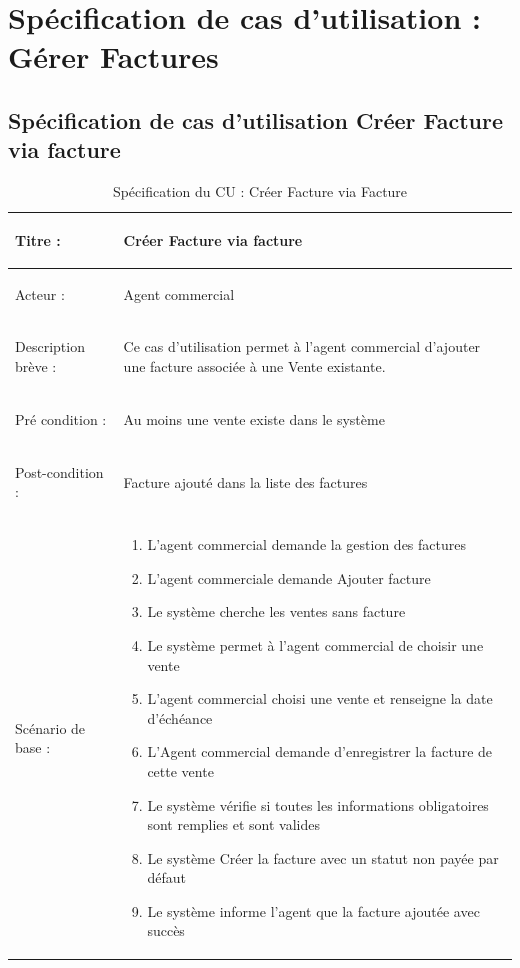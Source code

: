 \newpage
\section{Spécification de cas d'utilisation : Gérer Factures}

\subsection{Spécification de cas d'utilisation Créer Facture via facture}

\begin{longtable}{|>{\bfseries\raggedright\arraybackslash}p{3.5cm}|p{\dimexpr\textwidth-3.5cm-4\tabcolsep-2\arrayrulewidth}|}
\caption{Spécification du CU : Créer Facture via Facture}
\label{tab:cu-creer-facture-facture}\\
\hline
Titre : & Créer Facture via facture \\
\hline
Acteur : & Agent commercial \\
\hline
Description brève : & Ce cas d'utilisation permet à l'agent commercial d'ajouter une facture associée à une Vente existante. \\
\hline
Pré condition : & Au moins une vente existe dans le système \\
\hline
Post-condition : & Facture ajouté dans la liste des factures \\
\hline
Scénario de base : &
\begin{enumerate}[leftmargin=1.5em, topsep=2pt, itemsep=1pt]
  \item L'agent commercial demande la gestion des factures
  \item L'agent commerciale demande Ajouter facture
  \item Le système cherche les ventes sans facture
  \item Le système permet à l'agent commercial de choisir une vente
  \item L'agent commercial choisi une vente et renseigne la date d'échéance
  \item L'Agent commercial demande d'enregistrer la facture de cette vente
  \item Le système vérifie si toutes les informations obligatoires sont remplies et sont valides
  \item Le système Créer la facture avec un statut non payée par défaut
  \item Le système informe l'agent que la facture ajoutée avec succès
\end{enumerate} \\

\end{longtable}

